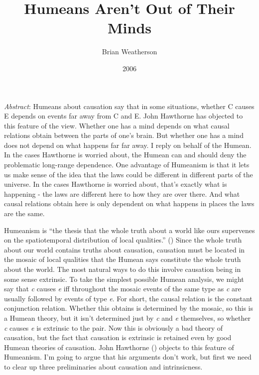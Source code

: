 \documentclass[
  11pt,
  letterpaper,
  DIV=11,
  numbers=noendperiod,
  twoside]{scrartcl}
\title{Humeans Aren't Out of Their Minds}
\author{Brian Weatherson}
\date{2006}
\renewenvironment{abstract}
 {\vspace{-1.25cm}
 \quotation\small\noindent\emph{Abstract}:}
 {\endquotation}
\renewenvironment{abstract}
 {\quotation\small\noindent\emph{Abstract}:}
 {\endquotation\vspace{-0.02cm}}
\begin{document}
\maketitle
\begin{abstract}
Humeans about causation say that in some situations, whether C causes E
depends on events far away from C and E. John Hawthorne has objected to
this feature of the view. Whether one has a mind depends on what causal
relations obtain between the parts of one's brain. But whether one has a
mind does not depend on what happens far far away. I reply on behalf of
the Humean. In the cases Hawthorne is worried about, the Humean can and
should deny the problematic long-range dependence. One advantage of
Humeanism is that it lets us make sense of the idea that the laws could
be different in different parts of the universe. In the cases Hawthorne
is worried about, that's exactly what is happening - the laws are
different here to how they are over there. And what causal relations
obtain here is only dependent on what happens in places the laws are the
same.
\end{abstract}


Humeanism is ``the thesis that the whole truth about a world like ours
supervenes on the spatiotemporal distribution of local qualities.''
() Since the whole truth about
our world contains truths about causation, causation must be located in
the mosaic of local qualities that the Humean says constitute the whole
truth about the world. The most natural ways to do this involve
causation being in some sense extrinsic. To take the simplest possible
Humean analysis, we might say that \emph{c} causes \emph{e} iff
throughout the mosaic events of the same type as \emph{c} are usually
followed by events of type \emph{e}. For short, the causal relation is
the constant conjunction relation. Whether this obtains is determined by
the mosaic, so this is a Humean theory, but it isn't determined just by
\emph{c} and \emph{e} themselves, so whether \emph{c} causes \emph{e} is
extrinsic to the pair. Now this is obviously a bad theory of causation,
but the fact that causation is extrinsic is retained even by good Humean
theories of causation. John Hawthorne
() objects to this feature of
Humeanism. I'm going to argue that his arguments don't work, but first
we need to clear up three preliminaries about causation and
intrinsicness.
\end{document}
